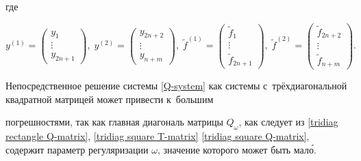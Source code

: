 где 

$$y^{(1)} = \left(

\begin{array}{c}

y_1 \\

\vdots\\

y_{2n+1}

\end{array}

\right), \; y^{(2)} = \left(

\begin{array}{c}

y_{2n+2} \\

\vdots \\

y_{n+m}

\end{array}

\right), \; 

\widetilde{f}^{(1)} = \left(

\begin{array}{c}

\widetilde{f}_1 \\

\vdots \\

\widetilde{f}_{2n+1}

\end{array}

\right), \; 

\widetilde{f}^{(2)} = \left(

\begin{array}{c}

{\widetilde{f}_{2n+2}} \\

\vdots \\

{\widetilde{f}_{n+m}}

\end{array}

\right).$$



Непосредственное решение системы \eqref{Q-system} как системы с~трёхдиагональной квадратной матрицей может привести к~большим

погрешностями, так как главная диагональ матрицы $Q_{\omega}$, как следует из \eqref{tridiag rectangle Q-matrix}, \eqref{tridiag square T-matrix} \eqref{tridiag square Q-matrix}, содержит параметр регуляризации $\omega$, значение которого может быть мал\'о.



